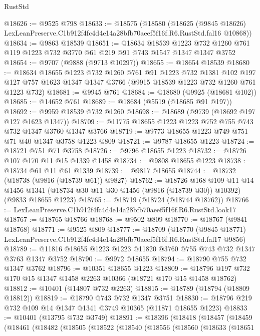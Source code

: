 \begin{lexlean}{RustStd}
\begin{coremodule}
@18626 := @9525 @798
@18633 := @18575
    (@18580
      (@18625
        (@9845 @18626)
        LexLeanPreserve.C1b912f4fc4d4e14a28bfb70aeef5f16f.R6.RustStd.fal16
        @10868))
@18634 := @9863 @18539
@18651 := @18634
    @18539
    @1223
    @732
    @1260
    @761
    @119
    @1223
    @732
    @3770
    @61
    @219
    @91
    @743
    @1547
    @1347
    @1347
    @3752
@18654 := @9707 (@9888 (@9713 @10297))
@18655 := @18654 @18539
@18680 := @18634
    @18655
    @1223
    @732
    @1260
    @761
    @91
    @1223
    @732
    @1381
    @102
    @197
    @127
    @757
    @1623
    @1347
    @1347
    @3766
    (@9915 @18539 @1223 @732 @1260 @761 @1223 @732)
@18681 := @9945 @761
@18684 := @18680 (@9925 (@18681 @102))
@18685 := @14652 @761
@18689 := @18684 (@5519 (@18685 @91 @197))
@18692 := @9959 @18539 @732 @1260
@18698 := @18689 (@9739 (@18692 @197 @127 @1623 @1347))
@18709 := @11775 @18655 @1223 @1223 @752 @755 @743 @732 @1347 @3760 @1347 @3766
@18719 := @9773 @18655 @1223 @749 @751 @71 @40 @1347 @3758 @1223 @809
@18721 := @9787 @18655 @1223
@18724 := @18721 @751 @71 @3758
@18726 := @9796 @18655 @1223
@18732 := @18726 @107 @170 @11 @15 @1339 @1458
@18734 := @9808 @18655 @1223
@18738 := @18734 @61 @11 @61 @1339
@18739 := @9817 @18655
@18744 := @18732 (@18738 (@9816 (@18739 @61)) @9827)
@18762 := @18726
    @168
    @109
    @11
    @14
    @1456
    @1341
    (@18734 @30 @11 @30 @1456 (@9816 (@18739 @30)) @10392)
    (@9833 @18655 @1223)
@18765 := @18719 (@18724 (@18744 @18762))
@18766 := LexLeanPreserve.C1b912f4fc4d4e14a28bfb70aeef5f16f.R6.RustStd.look17
@18767 := @18765 @18766
@18768 := @9502 @809
@18770 := @18767 (@9841 @18768)
@18771 := @9525 @809
@18777 := @18709
    (@18770 (@9845 @18771) LexLeanPreserve.C1b912f4fc4d4e14a28bfb70aeef5f16f.R6.RustStd.fal17 @9856)
@18789 := @11816 @18655 @1223 @1223 @11820 @3760 @755 @743 @732 @1347 @3763 @1347 @3752
@18790 := @9972 @18655
@18794 := @18790 @755 @732 @1347 @3762
@18796 := @10351 @18655 @1223
@18809 := @18796 @197 @732 @170 @15 @1347 @1458 @2263 @10366 (@18721 @170 @15 @1458 @18762)
@18812 := @10401 (@14807 @732 @2263)
@18815 := @18789 (@18794 (@18809 @18812))
@18819 := @18790 @743 @732 @1347 @3751
@18830 := @18796 @219 @732 @109 @14 @1347 @1341 @3749 @10365 (@11871 @18655 @1223)
@18833 := @10401 (@13795 @732 @3749)
@18891 := @18396
    (@18418
      (@18457
        (@18459
          (@18461
            (@18482
              (@18505
                (@18522
                  (@18540
                    (@18556
                      (@18560
                        (@18633
                          (@18651

\end{coremodule}
\end{lexlean}
